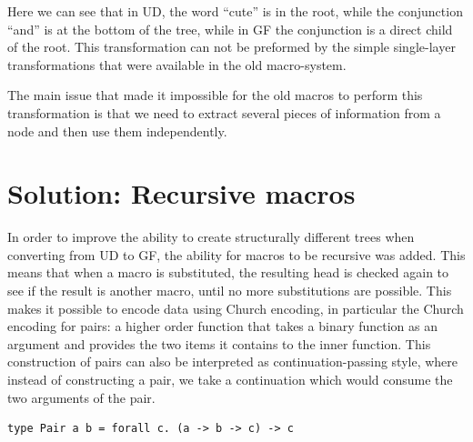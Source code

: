 
Here we can see that in UD, the word ``cute'' is in the root, while the conjunction ``and'' is at the bottom of the tree, while in GF the conjunction is a direct child of the root. This transformation can not be preformed by the simple single-layer transformations that were available in the old macro-system.

The main issue that made it impossible for the old macros to perform this transformation is that we need to extract several pieces of information from a node and then use them independently.

\section{Solution: Recursive macros}

%
%
%
%

In order to improve the ability to create structurally different trees when converting from UD to GF, the ability for macros to be recursive was added.
This means that when a macro is substituted, the resulting head is checked again to see if the result is another macro, until no more substitutions are possible.
This makes it possible to encode data using Church encoding, in particular the Church encoding for pairs: a higher order function that takes a binary function as an argument and provides the two items it contains to the inner function.
This construction of pairs can also be interpreted as continuation-passing style, where instead of constructing a pair, we take a continuation which would consume the two arguments of the pair.

\begin{verbatim}
type Pair a b = forall c. (a -> b -> c) -> c
\end{verbatim}

